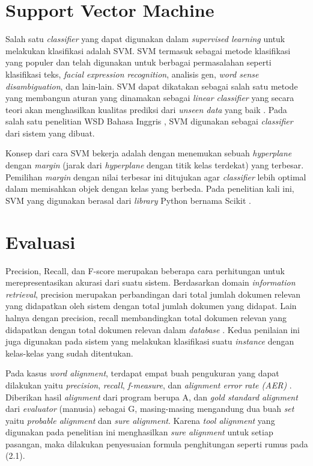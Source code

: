 \section{Support Vector Machine}
Salah satu \textit{classifier} yang dapat digunakan dalam \textit{supervised learning} untuk melakukan klasifikasi adalah SVM. SVM termasuk sebagai metode klasifikasi yang populer dan telah digunakan untuk berbagai permasalahan seperti klasifikasi teks, \textit{facial expression recognition}, analisis gen, \textit{word sense disambiguation}, dan lain-lain. SVM dapat dikatakan sebagai salah satu metode yang membangun aturan yang dinamakan sebagai \textit{linear classifier} yang secara teori akan menghasilkan kualitas prediksi dari \textit{unseen data} yang baik \citep{fradkin2006support}. Pada salah satu penelitian WSD Bahasa Inggris \citep{zhong2010makes}, SVM digunakan sebagai \textit{classifier} dari sistem yang dibuat.

Konsep dari cara SVM bekerja adalah dengan menemukan sebuah \textit{hyperplane} dengan \textit{margin} (jarak dari \textit{hyperplane} dengan titik kelas terdekat) yang terbesar. Pemilihan \textit{margin} dengan nilai terbesar ini ditujukan agar \textit{classifier} lebih optimal dalam memisahkan objek dengan kelas yang berbeda. Pada penelitian kali ini, SVM yang digunakan berasal dari \textit{library} Python bernama Scikit \citep{scikit-learn}.

\section{Evaluasi}

Precision, Recall, dan F-score merupakan beberapa cara perhitungan untuk merepresentasikan akurasi dari suatu sistem. Berdasarkan domain \textit{information retrieval}, precision merupakan perbandingan dari total jumlah dokumen relevan yang didapatkan oleh sistem dengan total jumlah dokumen yang didapat. Lain halnya dengan precision, recall membandingkan total dokumen relevan yang didapatkan dengan total dokumen relevan dalam \textit{database} \citep{ting2011precision}. Kedua penilaian ini juga digunakan pada sistem yang melakukan klasifikasi suatu \textit{instance} dengan kelas-kelas yang sudah ditentukan.

Pada kasus \textit{word alignment}, terdapat empat buah pengukuran yang dapat dilakukan yaitu \textit{precision}, \textit{recall}, \textit{f-measure}, dan \textit{alignment error rate (AER)} \citep{mihalcea2003evaluation}. Diberikan hasil \textit{alignment} dari program berupa A, dan \textit{gold standard alignment} dari \textit{evaluator} (manusia) sebagai G, masing-masing mengandung dua buah \textit{set} yaitu \textit{probable alignment} dan \textit{sure alignment}. Karena \textit{tool alignment} yang digunakan pada penelitian ini menghasilkan \textit{sure alignment} untuk setiap pasangan, maka dilakukan penyesuaian formula penghitungan seperti rumus pada (2.1).

